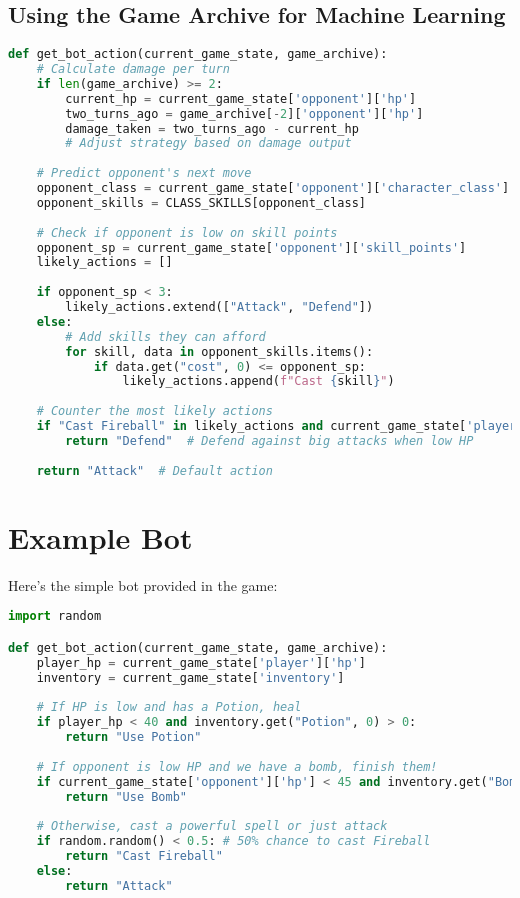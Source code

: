 \documentclass[12pt]{article}
\begin{document}
\subsection{Using the Game Archive for Machine Learning}
\begin{lstlisting}[language=Python, caption=Advanced Archive Analysis]
def get_bot_action(current_game_state, game_archive):
    # Calculate damage per turn
    if len(game_archive) >= 2:
        current_hp = current_game_state['opponent']['hp']
        two_turns_ago = game_archive[-2]['opponent']['hp']
        damage_taken = two_turns_ago - current_hp
        # Adjust strategy based on damage output
    
    # Predict opponent's next move
    opponent_class = current_game_state['opponent']['character_class']
    opponent_skills = CLASS_SKILLS[opponent_class]
    
    # Check if opponent is low on skill points
    opponent_sp = current_game_state['opponent']['skill_points']
    likely_actions = []
    
    if opponent_sp < 3:
        likely_actions.extend(["Attack", "Defend"])
    else:
        # Add skills they can afford
        for skill, data in opponent_skills.items():
            if data.get("cost", 0) <= opponent_sp:
                likely_actions.append(f"Cast {skill}")
    
    # Counter the most likely actions
    if "Cast Fireball" in likely_actions and current_game_state['player']['hp'] < 50:
        return "Defend"  # Defend against big attacks when low HP
    
    return "Attack"  # Default action
\end{lstlisting}

\section{Example Bot}
\label{sec:example}

Here's the simple bot provided in the game:

\begin{lstlisting}[language=Python, caption=Example Bot Implementation]
import random

def get_bot_action(current_game_state, game_archive):
    player_hp = current_game_state['player']['hp']
    inventory = current_game_state['inventory']
    
    # If HP is low and has a Potion, heal
    if player_hp < 40 and inventory.get("Potion", 0) > 0:
        return "Use Potion"
    
    # If opponent is low HP and we have a bomb, finish them!
    if current_game_state['opponent']['hp'] < 45 and inventory.get("Bomb", 0) > 0:
        return "Use Bomb"
        
    # Otherwise, cast a powerful spell or just attack
    if random.random() < 0.5: # 50% chance to cast Fireball
        return "Cast Fireball"
    else:
        return "Attack"
\end{lstlisting}
\end{document}
